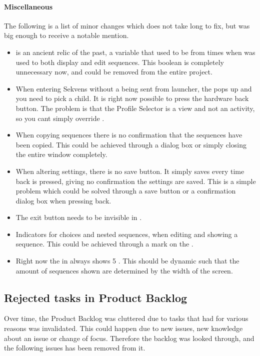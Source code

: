 \paragraph{Miscellaneous}
The following is a list of minor changes which does not take long to fix, but was big enough to receive a notable mention. 

\begin{itemize}
\item {} is an ancient relic of the past, a variable that used to be from times when  was used to both display and edit sequences. This boolean is completely unnecessary now, and could be removed from the entire project.
\item When entering Sekvens without a  being sent from launcher, the  pops up and you need to pick a child. It is right now possible to press the hardware back button. The problem is that the Profile Selector is a view and not an activity, so you cant simply override .
\item When copying sequences there is no confirmation that the sequences have been copied. This could be achieved through a dialog box or simply closing the entire window completely.
\item When altering settings, there is no save button. It simply saves every time back is pressed, giving no confirmation the settings are saved. This is a simple problem which could be solved through a save button or a confirmation dialog box when pressing back.
\item The exit button needs to be invisible in . 
\item Indicators for choices and nested sequences, when editing and showing a sequence. This could be achieved through a mark on the .
\item Right now the  in  always shows 5 . This should be dynamic such that the amount of sequences shown are determined by the width of the screen.
\end{itemize}

\subsection{Rejected tasks in Product Backlog}
Over time, the Product Backlog was cluttered due to tasks that had for various reasons was invalidated. This could happen due to new issues, new knowledge about an issue or change of focus. Therefore the backlog was looked through, and the following issues has been removed from it.


